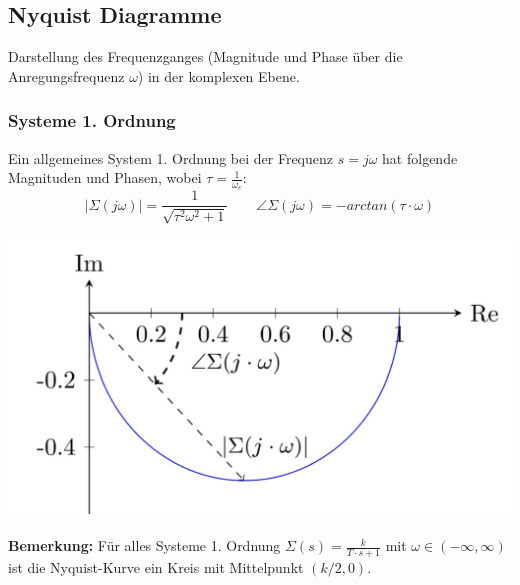     \subsection{Nyquist Diagramme}
        Darstellung des Frequenzganges (Magnitude und Phase über die Anregungsfrequenz $\omega$) in der komplexen Ebene.
        \subsubsection{Systeme 1. Ordnung}
        Ein allgemeines System 1. Ordnung bei der Frequenz $s= j\omega$ hat folgende Magnituden und Phasen, wobei $\tau = \frac{1}{\omega_c} $:
        \[|\Sigma(j\omega)| = \frac{1}{\sqrt{\tau^2\omega^2+1}}
        \qquad
        \angle\Sigma(j\omega) = -arctan(\tau\cdot\omega)
         \]
        \begin{center}
        \vspace{-2mm}
            \includegraphics[width=0.6\linewidth ]{images/05/Nyq_1Ordnung.jpg}
        \end{center}
        \textbf{Bemerkung:} Für alles Systeme 1. Ordnung $\displaystyle\Sigma(s)=\frac{k}{T\cdot s+1}$ mit $\omega\in(-\infty,\infty)$ ist die Nyquist-Kurve ein Kreis mit Mittelpunkt $(k/2,0)$.
    
